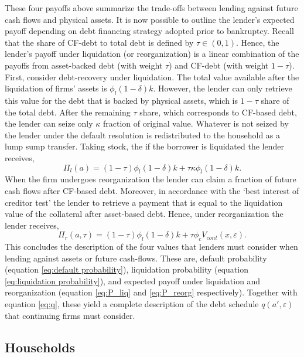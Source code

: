 \documentclass[12pt]{article}
\begin{document}
These four payoffs above summarize the trade-offs between lending against future cash flows and physical assets. It is now possible to outline the lender's expected payoff depending on debt financing strategy adopted prior to bankruptcy. Recall that the share of CF-debt to total debt is defined by $\tau \in (0,1)$. Hence, the lender's payoff under liquidation (or reorganization) is a linear combination of the payoffs from asset-backed debt (with weight $\tau$) and CF-debt (with weight $1-\tau$). \vspace{3mm} \\
First, consider debt-recovery under liquidation. The total value available after the liquidation of firms' assets is $\phi_l (1-\delta) k$. However, the lender can only retrieve this value for the debt that is backed by physical assets, which is $1-\tau$ share of the total debt. After the remaining $\tau$ share, which corresponds to CF-based debt, the lender can seize only $\kappa$ fraction of original value. Whatever is not seized by the lender under the default resolution is redistributed to the household as a lump sump transfer. Taking stock, the if the borrower is liquidated the lender receives,
\begin{equation} \label{eq:P_liq} 
   \Pi_{l}(a) = (1-\tau) \phi_l (1-\delta) k +\tau \kappa \phi_l  (1-\delta) k. 
\end{equation}
When the firm undergoes reorganization the lender can claim a fraction of future cash flows after CF-based debt. Moreover, in accordance with the `best interest of creditor test' the lender to retrieve a payment that is equal to the liquidation value of the collateral after asset-based debt. Hence, under reorganization the lender receives,
\begin{equation}  \label{eq:P_reorg}
   \Pi_{r}(a,\tau) = (1-\tau) \phi_l (1-\delta) k +\tau \phi_c V_{cont} (x, \varepsilon).
\end{equation}
This concludes the description of the four values that lenders must consider when lending against assets or future cash-flows. These are, default probability (equation \ref{eq:default probability}), liquidation probability (equation \ref{eq:liquidation probability}), and expected payoff under liquidation and reorganization (equation \ref{eq:P_liq} and \ref{eq:P_reorg} respectively). Together with equation \ref{eq:q}, these yield a complete description of the debt schedule $q(a', \varepsilon)$ that continuing firms must consider. 

\subsection{Households}\label{sec:hh}
\end{document}
